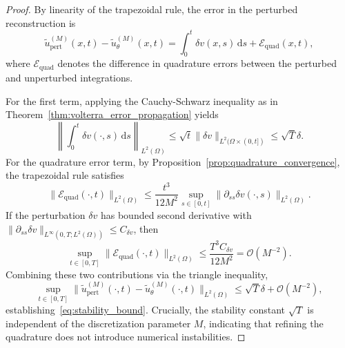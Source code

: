 \documentclass[11pt,reqno]{amsart}
\theoremstyle{plain}
\theoremstyle{definition}
\theoremstyle{remark}
\begin{document}
\begin{proof}
By linearity of the trapezoidal rule, the error in the perturbed reconstruction is
\begin{equation}
    \tilde{u}_{\text{pert}}^{(M)}(x,t) - \tilde{u}_\theta^{(M)}(x,t) = \int_0^t \delta v(x,s) \, \mathrm{d}s + \mathcal{E}_{\text{quad}}(x,t),
\end{equation}
where $\mathcal{E}_{\text{quad}}$ denotes the difference in quadrature errors between the perturbed and unperturbed integrations.

\noindent For the first term, applying the Cauchy-Schwarz inequality as in Theorem~\ref{thm:volterra_error_propagation} yields
\begin{equation}
    \left\| \int_0^t \delta v(\cdot,s) \, \mathrm{d}s \right\|_{L^2(\Omega)} \leq \sqrt{t} \|\delta v\|_{L^2(\Omega \times (0,t])} \leq \sqrt{T} \delta.
\end{equation}
For the quadrature error term, by Proposition~\ref{prop:quadrature_convergence}, the trapezoidal rule satisfies
\begin{equation}
    \|\mathcal{E}_{\text{quad}}(\cdot,t)\|_{L^2(\Omega)} \leq \frac{t^3}{12M^2} \sup_{s \in [0,t]} \|\partial_{ss} \delta v(\cdot, s)\|_{L^2(\Omega)}.
\end{equation}
If the perturbation $\delta v$ has bounded second derivative with $\|\partial_{ss} \delta v\|_{L^\infty(0,T; L^2(\Omega))} \leq C_{\delta v}$, then
\begin{equation}
    \sup_{t \in [0,T]} \|\mathcal{E}_{\text{quad}}(\cdot,t)\|_{L^2(\Omega)} \leq \frac{T^3 C_{\delta v}}{12M^2} = \mathcal{O}(M^{-2}).
\end{equation}
Combining these two contributions via the triangle inequality,
\begin{equation}
    \sup_{t \in [0,T]} \|\tilde{u}_{\text{pert}}^{(M)}(\cdot, t) - \tilde{u}_\theta^{(M)}(\cdot, t)\|_{L^2(\Omega)} \leq \sqrt{T} \delta + \mathcal{O}(M^{-2}),
\end{equation}
establishing~\eqref{eq:stability_bound}. Crucially, the stability constant $\sqrt{T}$ is independent of the discretization parameter $M$, indicating that refining the quadrature does not introduce numerical instabilities.
\end{proof}
\end{document}
